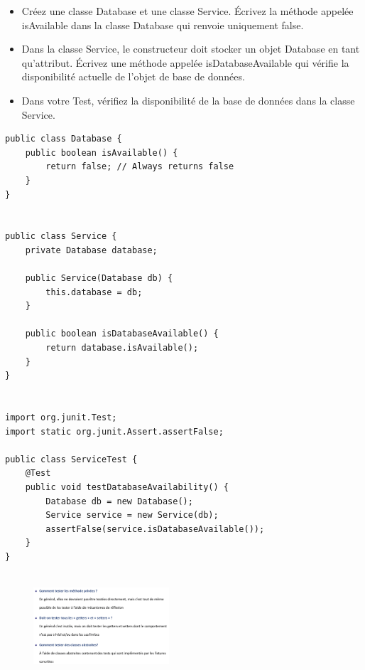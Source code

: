 \documentclass[16pt]{report}
\begin{document}
\begin{multicols*}{2}
    \begin{Exercice}{}{}
        \begin{itemize}
            \item Créez une classe Database et une classe Service. Écrivez la méthode appelée
            isAvailable dans la classe Database qui renvoie uniquement false. 
            \item Dans la classe Service, le constructeur doit stocker un objet Database en tant
            qu'attribut. Écrivez une méthode appelée isDatabaseAvailable qui vérifie la
            disponibilité actuelle de l’objet de base de données.
            \item Dans votre Test, vérifiez la disponibilité de la base de
                données dans la classe Service.
        \end{itemize}

\begin{lstlisting}[style=JavaDraculaWhite]
public class Database {
    public boolean isAvailable() {
        return false; // Always returns false
    }
}


public class Service {
    private Database database;

    public Service(Database db) {
        this.database = db;
    }

    public boolean isDatabaseAvailable() {
        return database.isAvailable();
    }
}


import org.junit.Test;
import static org.junit.Assert.assertFalse;

public class ServiceTest {
    @Test
    public void testDatabaseAvailability() {
        Database db = new Database();
        Service service = new Service(db);
        assertFalse(service.isDatabaseAvailable());
    }
}


\end{lstlisting}

    \end{Exercice}


    \begin{figure}[H]
        \begin{center}
            \includegraphics[width=0.45\textwidth]{qtypique1.png}
        \end{center}
    \end{figure}
    


\end{multicols*}
\end{document}
